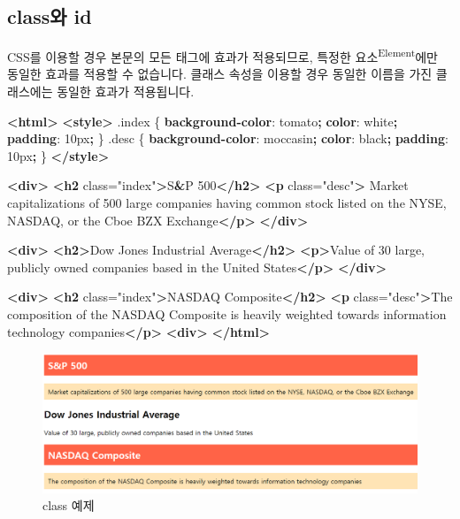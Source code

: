\documentclass[]{book}
\newenvironment{Shaded}{\begin{snugshade}}{\end{snugshade}}
\newcommand{\ConstantTok}[1]{\textcolor[rgb]{0.00,0.00,0.00}{#1}}
\newcommand{\DataTypeTok}[1]{\textcolor[rgb]{0.13,0.29,0.53}{#1}}
\newcommand{\DecValTok}[1]{\textcolor[rgb]{0.00,0.00,0.81}{#1}}
\newcommand{\ErrorTok}[1]{\textcolor[rgb]{0.64,0.00,0.00}{\textbf{#1}}}
\newcommand{\FunctionTok}[1]{\textcolor[rgb]{0.00,0.00,0.00}{#1}}
\newcommand{\KeywordTok}[1]{\textcolor[rgb]{0.13,0.29,0.53}{\textbf{#1}}}
\newcommand{\NormalTok}[1]{#1}
\newcommand{\OperatorTok}[1]{\textcolor[rgb]{0.81,0.36,0.00}{\textbf{#1}}}
\newcommand{\OtherTok}[1]{\textcolor[rgb]{0.56,0.35,0.01}{#1}}
\newcommand{\StringTok}[1]{\textcolor[rgb]{0.31,0.60,0.02}{#1}}
\begin{document}
\hypertarget{class-id}{%
\subsection{class와 id}\label{class-id}}

CSS를 이용할 경우 본문의 모든 태그에 효과가 적용되므로, 특정한 요소\textsuperscript{Element}에만 동일한 효과를 적용할 수 없습니다. 클래스 속성을 이용할 경우 동일한 이름을 가진 클래스에는 동일한 효과가 적용됩니다.

\begin{Shaded}
\begin{Highlighting}[]
\KeywordTok{<html>}
\KeywordTok{<style>}
\FunctionTok{.index}\NormalTok{ \{}
  \KeywordTok{background-color}\NormalTok{: }\ConstantTok{tomato}\OperatorTok{;}
\KeywordTok{color}\NormalTok{: }\ConstantTok{white}\OperatorTok{;}
\KeywordTok{padding}\NormalTok{: }\DecValTok{10}\DataTypeTok{px}\OperatorTok{;}
\NormalTok{\} }
\FunctionTok{.desc}\NormalTok{ \{}
  \KeywordTok{background-color}\NormalTok{: }\ConstantTok{moccasin}\OperatorTok{;}
  \KeywordTok{color}\NormalTok{: }\ConstantTok{black}\OperatorTok{;}
  \KeywordTok{padding}\NormalTok{: }\DecValTok{10}\DataTypeTok{px}\OperatorTok{;}
\NormalTok{\} }
\KeywordTok{</style>}

\KeywordTok{<div>}
\KeywordTok{<h2}\OtherTok{ class=}\StringTok{"index"}\KeywordTok{>}\NormalTok{S}\ErrorTok{&}\NormalTok{P 500}\KeywordTok{</h2>}
\KeywordTok{<p}\OtherTok{ class=}\StringTok{"desc"}\KeywordTok{>}\NormalTok{ Market capitalizations of 500 large companies having common stock listed on the NYSE, NASDAQ, or the Cboe BZX Exchange}\KeywordTok{</p>}
\KeywordTok{</div>}

\KeywordTok{<div>}
\KeywordTok{<h2>}\NormalTok{Dow Jones Industrial Average}\KeywordTok{</h2>}
\KeywordTok{<p>}\NormalTok{Value of 30 large, publicly owned companies based in the United States}\KeywordTok{</p>}
\KeywordTok{</div>}

\KeywordTok{<div>}
\KeywordTok{<h2}\OtherTok{ class=}\StringTok{"index"}\KeywordTok{>}\NormalTok{NASDAQ Composite}\KeywordTok{</h2>}
\KeywordTok{<p}\OtherTok{ class=}\StringTok{"desc"}\KeywordTok{>}\NormalTok{The composition of the NASDAQ Composite is heavily weighted towards information technology companies}\KeywordTok{</p>}
\KeywordTok{<div>}
\KeywordTok{</html>}
\end{Highlighting}
\end{Shaded}

\begin{figure}

{\centering \includegraphics[width=0.5\linewidth]{images/html_9} 

}

\caption{class 예제}\label{fig:unnamed-chunk-24}
\end{figure}
\end{document}
